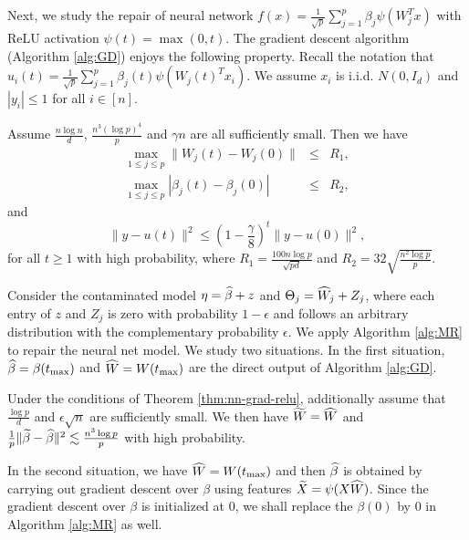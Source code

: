 Next, we study the repair of neural network $f(x)=\frac{1}{\sqrt{p}}\sum_{j=1}^p\beta_j\psi(W_j^Tx)$ with ReLU activation $\psi(t)=\max(0,t)$. The gradient descent algorithm (Algorithm \ref{alg:GD}) enjoys the following property. Recall the notation that $u_i(t)=\frac{1}{\sqrt{p}}\sum_{j=1}^p\beta_j(t)\psi(W_j(t)^Tx_i)$. We assume $x_i$ is i.i.d. $N(0,I_d)$ and $|y_i|\leq 1$ for all $i\in[n]$.
\begin{thm}\label{thm:nn-grad-relu}
Assume $\frac{n\log n}{d}$, $\frac{n^3(\log p)^4}{p}$ and $\gamma n$ are all sufficiently small. Then we have
\begin{eqnarray}
\label{eq:iter-parameter-relu} \max_{1\leq j\leq p}\|W_j(t)-W_j(0)\| &\leq& R_1, \\
\label{eq:iter-parameter-beta-relu} \max_{1\leq j\leq p}|\beta_j(t)-\beta_j(0)| &\leq& R_2,
\end{eqnarray}
and
\begin{equation}
\|y-u(t)\|^2 \leq \left(1-\frac{\gamma}{8}\right)^t\|y-u(0)\|^2, \label{eq:iter-function-relu}
\end{equation}
for all $t\geq 1$ with high probability, where $R_1=\frac{100n\log p}{\sqrt{pd}}$ and $R_2=32\sqrt{\frac{n^2\log p}{p}}$.
\end{thm}

Consider the contaminated model $\eta=\widehat{\beta}+z$ and $\Theta_j=\widehat{W}_j+Z_j$, where each entry of $z$ and $Z_j$ is zero with probability $1-\epsilon$ and follows an arbitrary distribution with the complementary probability $\epsilon$. We apply Algorithm \ref{alg:MR} to repair the neural net model. We study two situations. In the first situation, $\widehat{\beta}=\beta(t_{\max})$ and $\widehat{W}=W(t_{\max})$ are the direct output of Algorithm \ref{alg:GD}.

\begin{thm}\label{thm:repair-nn-1-relu}
Under the conditions of Theorem \ref{thm:nn-grad-relu}, additionally assume that $\frac{\log p}{d}$ and $\epsilon\sqrt{n}$ are sufficiently small. We then have $\widetilde{W}=\widehat{W}$ and $\frac{1}{p}\|\widetilde{\beta}-\widehat{\beta}\|^2 \lesssim \frac{n^3\log p}{p}$ with high probability.
\end{thm}

In the second situation, we have $\widehat{W}=W(t_{\max})$ and then $\widehat{\beta}$ is obtained by carrying out gradient descent over $\beta$ using features $\widetilde{X}=\psi(X\widehat{W})$. Since the gradient descent over $\beta$ is initialized at $0$, we shall replace the $\beta(0)$ by $0$ in Algorithm \ref{alg:MR} as well.

